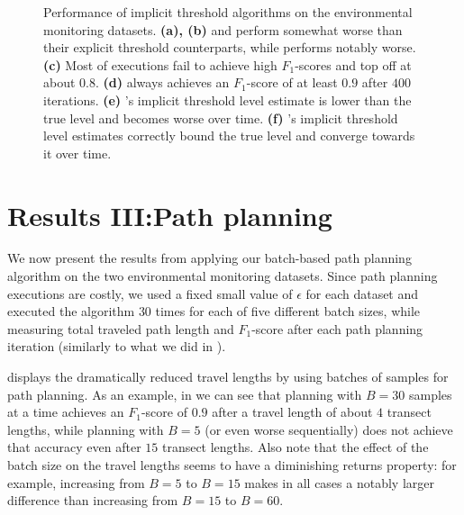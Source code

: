 \begin{figure}[tbp]
  \caption{Performance of implicit threshold algorithms on the environmental
           monitoring datasets.
           \textbf{(a), (b)} \iacl and \ibacl perform somewhat worse than their
           explicit threshold counterparts, while \istr performs notably worse.
           \textbf{(c)} Most of \istr executions fail to achieve high
           $F_1$-scores and top off at about $0.8$.
           \textbf{(d)} \iacl always achieves an $F_1$-score of at least $0.9$
           after $400$ iterations.
           \textbf{(e)} \istr's implicit threshold level estimate is lower than
           the true level and becomes worse over time.
           \textbf{(f)} \iacl's implicit threshold level estimates correctly bound
           the true level and converge towards it over time.
           }
  \label{fig:exp-imp}
\end{figure}

\section{Results III:\hspace{0.33em}Path planning}
We now present the results from applying our batch-based path planning
algorithm on the two environmental monitoring datasets. Since path planning
executions are costly, we used a fixed small value of $\epsilon$ for each
dataset and executed the algorithm $30$ times for each of five different
batch sizes, while measuring total traveled path length and $F_1$-score
after each path planning iteration (similarly to what we did in
).

 displays the dramatically reduced travel
lengths by using batches of samples for path planning.
As an example, in  we can see that
planning with $B=30$ samples at a time achieves an $F_1$-score
of $0.9$ after a travel length of about $4$ transect lengths,
while planning with $B=5$ (or even worse sequentially) does
not achieve that accuracy even after $15$ transect lengths.
Also note that the effect of the batch size on the travel
lengths seems to have a diminishing returns property:
for example, increasing from $B=5$ to $B=15$ makes in all
cases a notably larger
difference than increasing from $B=15$ to $B=60$.

